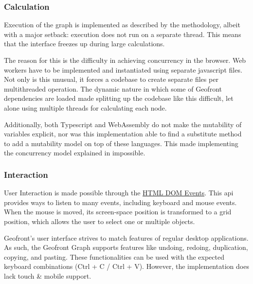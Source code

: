 
\subsubsection*{Calculation}
Execution of the graph is implemented as described by the methodology, albeit with a major setback: execution does not run on a separate thread. 
This means that the interface freezes up during large calculations.

The reason for this is the difficulty in achieving concurrency in the browser. 
Web workers have to be implemented and instantiated using separate javascript files. 
Not only is this unusual, it forces a codebase to create separate files per multithreaded operation.
The dynamic nature in which some of Geofront dependencies are loaded made splitting up the codebase like this difficult, let alone using multiple threads for calculating each node.

Additionally, both Typescript and WebAssembly do not make the mutability of variables explicit, nor was this implementation able to find a substitute method to add a mutability model on top of these languages. 
This made implementing the concurrency model explained in  impossible.

\subsubsection{Interaction}
User Interaction is made possible through the \href{https://developer.mozilla.org/en-US/docs/web/api/event}{HTML DOM Events}. 
This api provides ways to listen to many events, including keyboard and mouse events. 
When the mouse is moved, its screen-space position is transformed to a grid position, which allows the user to select one or multiple objects. 

Geofront's user interface strives to match features of regular desktop applications. 
As such, the Geofront Graph supports features like undoing, redoing, duplication, copying, and pasting. 
These functionalities can be used with the expected keyboard combinations (Ctrl + C / Ctrl + V).
However, the implementation does lack touch \& mobile support.

